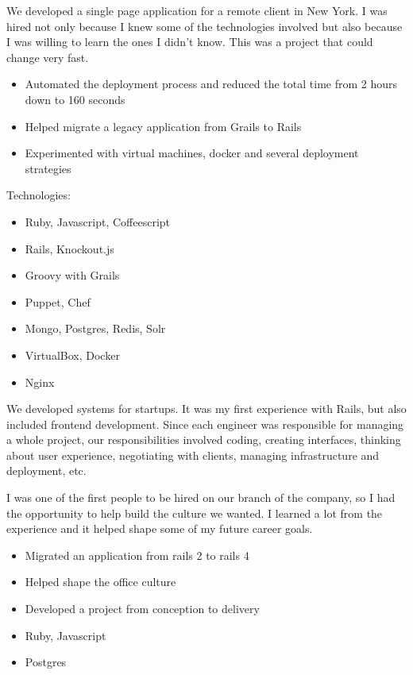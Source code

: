 \documentclass[10pt,a4paper,ragged2e,withhyper]{altacv}
\begin{document}
\begin{paracol}{2}
\divider


{\RaggedRight
We developed a single page application for a remote client in New York. I was hired not only because I knew some of the technologies involved but also because I was willing to learn the ones I didn't know. This was a project that could change very fast.

\begin{itemize}
\item Automated the deployment process and reduced the total time from 2 hours down to 160 seconds
\item Helped migrate a legacy application from Grails to Rails
\item Experimented with virtual machines, docker and several deployment strategies
\end{itemize}

Technologies:
\begin{itemize}
\item Ruby, Javascript, Coffeescript
\item Rails, Knockout.js
\item Groovy with Grails
\item Puppet, Chef
\item Mongo, Postgres, Redis, Solr
\item VirtualBox, Docker
\item Nginx
\end{itemize}
}

\divider


{\RaggedRight
We developed systems for startups. It was my first experience with Rails, but also included frontend development. Since each engineer was responsible for managing a whole project, our responsibilities involved coding, creating interfaces, thinking about user experience, negotiating with clients, managing infrastructure and deployment, etc.

I was one of the first people to be hired on our branch of the company, so I had the opportunity to help build the culture we wanted. I learned a lot from the experience and it helped shape some of my future career goals.

\begin{itemize}
\item Migrated an application from rails 2 to rails 4
\item Helped shape the office culture
\item Developed a project from conception to delivery
\item Ruby, Javascript
\item Postgres
\end{itemize}
}


\end{paracol}
\end{document}
